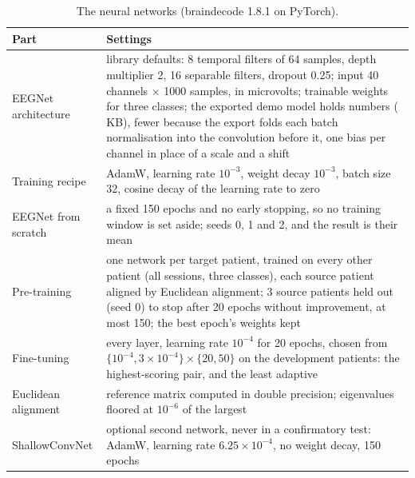 \begin{table}[!htbp]
\centering
\caption{The neural networks (braindecode 1.8.1 on PyTorch).}
\label{tab:app-hyper-deep}
\footnotesize
\begin{tabularx}{\textwidth}{>{\raggedright\arraybackslash}p{3.0cm}>{\raggedright\arraybackslash}X}
\toprule
Part & Settings \\
\midrule
EEGNet architecture & library defaults: 8 temporal filters of 64 samples, depth multiplier 2, 16 separable filters, dropout 0.25; input 40 channels $\times$ 1000 samples, in microvolts; \dlEegnetWeights{} trainable weights for three classes; the exported demo model holds \demoParameters{} numbers (\demoModelKb{}\,KB), fewer because the export folds each batch normalisation into the convolution before it, one bias per channel in place of a scale and a shift \\
Training recipe & AdamW, learning rate $10^{-3}$, weight decay $10^{-3}$, batch size 32, cosine decay of the learning rate to zero \\
EEGNet from scratch & a fixed 150 epochs and no early stopping, so no training window is set aside; seeds 0, 1 and 2, and the result is their mean \\
Pre-training & one network per target patient, trained on every other patient (all sessions, three classes), each source patient aligned by Euclidean alignment; 3 source patients held out (seed 0) to stop after 20 epochs without improvement, at most 150; the best epoch's weights kept \\
Fine-tuning & every layer, learning rate $10^{-4}$ for 20 epochs, chosen from $\{10^{-4}, 3\times10^{-4}\} \times \{20, 50\}$ on the development patients: the highest-scoring pair, and the least adaptive \\
Euclidean alignment & reference matrix computed in double precision; eigenvalues floored at $10^{-6}$ of the largest \\
ShallowConvNet & optional second network, never in a confirmatory test: AdamW, learning rate $6.25\times10^{-4}$, no weight decay, 150 epochs \\
\bottomrule
\end{tabularx}
\end{table}

